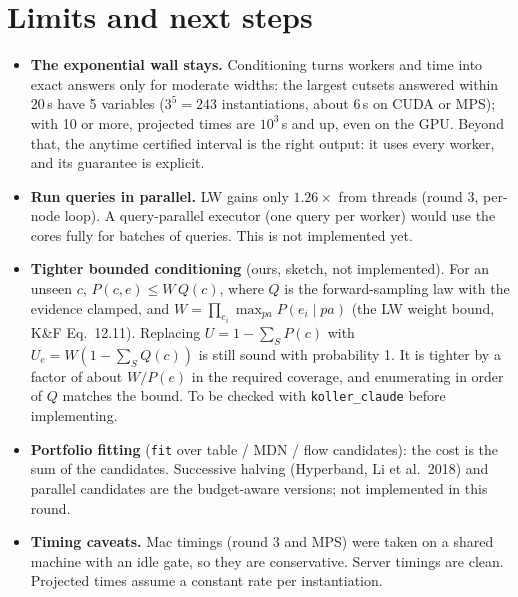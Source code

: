 \documentclass[10pt,a4paper]{article}
\newcommand{\code}[1]{\texttt{#1}}
\begin{document}
\section{Limits and next steps}
\label{sec:next}
\begin{itemize}
\item \textbf{The exponential wall stays.} Conditioning turns workers and time into exact
answers only for moderate widths: the largest cutsets answered within 20\,s have 5 variables
($3^5=243$ instantiations, about 6\,s on CUDA or MPS); with 10 or more, projected times are
$10^3$\,s and up, even on the GPU. Beyond that, the anytime certified interval is the right output: it uses every worker,
and its guarantee is explicit.
\item \textbf{Run queries in parallel.} LW gains only $1.26\times$ from threads (round 3,
per-node loop). A query-parallel executor (one query per worker) would use the cores fully for
batches of queries. This is not implemented yet.
\item \textbf{Tighter bounded conditioning} (ours, sketch, not implemented). For an unseen $c$,
$P(c,e)\le W\,Q(c)$, where $Q$ is the forward-sampling law with the evidence clamped, and
$W=\prod_{e_i}\max_{pa}P(e_i\mid pa)$ (the LW weight bound, K\&F Eq.\ 12.11). Replacing
$U=1-\sum_S P(c)$ with $U_e=W(1-\sum_S Q(c))$ is still sound with probability 1. It is tighter
by a factor of about $W/P(e)$ in the required coverage, and enumerating in order of $Q$ matches the
bound. To be checked with \code{koller\_claude} before implementing.
\item \textbf{Portfolio fitting} (\code{fit} over table / MDN / flow candidates): the cost is the
sum of the candidates. Successive halving (Hyperband, Li et al.\ 2018) and parallel candidates
are the budget-aware versions; not implemented in this round.
\item \textbf{Timing caveats.} Mac timings (round 3 and MPS) were taken on a shared machine with
an idle gate, so they are conservative. Server timings are clean. Projected times assume a
constant rate per instantiation.
\end{itemize}
\end{document}
